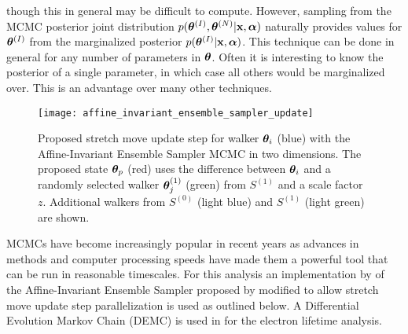 \noindent though this in general may be difficult to compute.  However, sampling from the MCMC posterior joint distribution
$p(\boldsymbol{\theta}^{(I)}, \boldsymbol{\theta}^{(N)}|\mathbf{x}, \boldsymbol{\alpha})$ naturally provides values for $\boldsymbol{\theta}^{(I)}$ from the
marginalized posterior $p(\boldsymbol{\theta}^{(I)}|\mathbf{x}, \boldsymbol{\alpha})$.  This technique can be done in general for any number of
parameters in $\boldsymbol{\theta}$.  Often it is interesting to know the posterior of a single parameter, in which case all others would
be marginalized over.  This is an advantage over many other techniques.

\begin{figure}
\centering
\texttt{[image: affine\_invariant\_ensemble\_sampler\_update]}
\caption[Proposed stretch move update step for walker $\vect{\theta}_i$ with the Affine-Invariant Ensemble Sampler MCMC in two
dimensions.]{Proposed stretch move update step for walker $\vect{\theta}_i$ (blue) with the Affine-Invariant Ensemble Sampler MCMC in two
dimensions.  The proposed state $\boldsymbol{\theta}_p$ (red) uses the difference between $\vect{\theta}_i$ and a randomly selected walker
$\boldsymbol{\theta}_j^{(1)}$ (green) from $S^{(1)}$ and a scale factor $z$.  Additional walkers from $S^{(0)}$ (light blue) and $S^{(1)}$ (light
green) are shown.}
\label{fig:er_nr_calibrations_parameter_determ_mcmc_update}
\end{figure}

MCMCs have become increasingly popular in recent years as advances in methods and computer processing speeds have made them
a powerful tool that can be run in reasonable timescales.  For this analysis an implementation by  of
the Affine-Invariant Ensemble Sampler proposed by  modified to allow stretch move update step parallelization is
used as outlined below.  A Differential Evolution Markov Chain (DEMC) is used in  for the electron
lifetime analysis.

